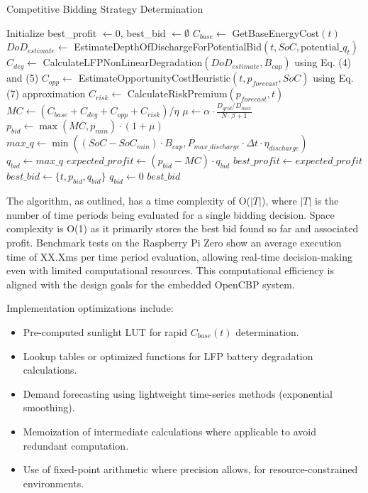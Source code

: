\documentclass[11pt,a4paper]{article}
\begin{document}
\begin{algorithm}
\caption{Competitive Bidding Strategy Determination}
\label{alg:bidding}
\begin{algorithmic}[1]
\State Initialize best\_profit $\gets 0$, best\_bid $\gets \emptyset$
    \State $C_{base} \gets$ GetBaseEnergyCost$(t)$ 
    \State $DoD_{estimate} \gets$ EstimateDepthOfDischargeForPotentialBid$(t, SoC, \text{potential\_}q_t)$
    \State $C_{deg} \gets$ CalculateLFPNonLinearDegradation$(DoD_{estimate}, B_{cap})$ using Eq. (4) and (5)
    \State $C_{opp} \gets$ EstimateOpportunityCostHeuristic$(t, p_{forecast}, SoC)$ using Eq. (7) approximation
    \State $C_{risk} \gets$ CalculateRiskPremium$(p_{forecast}, t)$
    \State $MC \gets (C_{base} + C_{deg} + C_{opp} + C_{risk}) / \eta$ 
    \State $\mu \gets \alpha \cdot \frac{D_{grid}/D_{max}}{N \cdot \beta + 1}$ 
    \State $p_{bid} \gets \max(MC, p_{min}) \cdot (1 + \mu)$ 
    \State $max\_q \gets \min((SoC - SoC_{min}) \cdot B_{cap}, P_{max\_discharge} \cdot \Delta t \cdot \eta_{discharge})$ 
        \State $q_{bid} \gets max\_q$ 
        \State $expected\_profit \gets (p_{bid} - MC) \cdot q_{bid}$
            \State $best\_profit \gets expected\_profit$
            \State $best\_bid \gets \{t, p_{bid}, q_{bid}\}$
        \EndIf
    \Else
        \State $q_{bid} \gets 0$ 
    \EndIf
\EndFor
\State \Return $best\_bid$
\EndProcedure
\end{algorithmic}
\end{algorithm}

The algorithm, as outlined, has a time complexity of O($|T|$), where $|T|$ is the number of time periods being evaluated for a single bidding decision. Space complexity is O(1) as it primarily stores the best bid found so far and associated profit. Benchmark tests on the Raspberry Pi Zero show an average execution time of XX.Xms per time period evaluation, allowing real-time decision-making even with limited computational resources. This computational efficiency is aligned with the design goals for the embedded OpenCBP system.

Implementation optimizations include:
\begin{itemize}
    \item Pre-computed sunlight LUT for rapid $C_{base}(t)$ determination.
    \item Lookup tables or optimized functions for LFP battery degradation calculations.
    \item Demand forecasting using lightweight time-series methods (exponential smoothing).
    \item Memoization of intermediate calculations where applicable to avoid redundant computation.
    \item Use of fixed-point arithmetic where precision allows, for resource-constrained environments.
\end{itemize}
\end{document}
